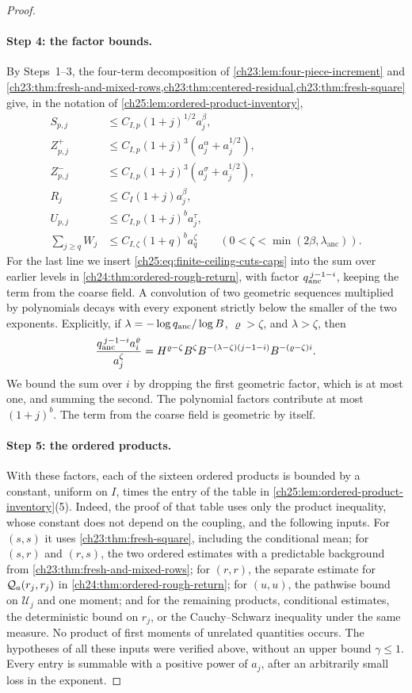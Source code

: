 \begin{proof}
\paragraph{Step 4: the factor bounds.}
By Steps~1--3, the four-term decomposition of \cref{ch23:lem:four-piece-increment} and \cref{ch23:thm:fresh-and-mixed-rows,ch23:thm:centered-residual,ch23:thm:fresh-square} give, in the notation of \cref{ch25:lem:ordered-product-inventory},
\[
\begin{split}
 S_{p,j}&\le C_{I,p}(1+j)^{1/2}a_j^\beta,\\
 Z^+_{p,j}&\le C_{I,p}(1+j)^3(a_j^\alpha+a_j^{1/2}),\\
 Z^-_{p,j}&\le C_{I,p}(1+j)^3(a_j^\sigma+a_j^{1/2}),\\
 R_j&\le C_I(1+j)a_j^\beta,\\
 U_{p,j}&\le C_{I,p}(1+j)^ba_j^\tau,\\
 \sum_{j\ge q}W_j&\le C_{I,\zeta}(1+q)^ba_q^\zeta\qquad(0<\zeta<\min(2\beta,\lambda_{\mathrm{anc}})).
\end{split}
\]
For the last line we insert \eqref{ch25:eq:finite-ceiling-cuts-caps} into the sum over earlier levels in \cref{ch24:thm:ordered-rough-return}, with factor $q_{\mathrm{anc}}^{\,j-1-i}$, keeping the term from the coarse field. A convolution of two geometric sequences multiplied by polynomials decays with every exponent strictly below the smaller of the two exponents. Explicitly, if $\lambda=-\log q_{\mathrm{anc}}/\log B$, $\varrho>\zeta$, and $\lambda>\zeta$, then
\[
 \frac{q_{\mathrm{anc}}^{\,j-1-i}a_i^\varrho}{a_j^\zeta}=H^{\varrho-\zeta}B^\zeta B^{-(\lambda-\zeta)(j-1-i)}B^{-(\varrho-\zeta)i}.
\]
We bound the sum over $i$ by dropping the first geometric factor, which is at most one, and summing the second. The polynomial factors contribute at most $(1+j)^b$. The term from the coarse field is geometric by itself.

\paragraph{Step 5: the ordered products.}
With these factors, each of the sixteen ordered products is bounded by a constant, uniform on $I$, times the entry of the table in \cref{ch25:lem:ordered-product-inventory}(5). Indeed, the proof of that table uses only the product inequality, whose constant does not depend on the coupling, and the following inputs. For $(s,s)$ it uses \cref{ch23:thm:fresh-square}, including the conditional mean; for $(s,r)$ and $(r,s)$, the two ordered estimates with a predictable background from \cref{ch23:thm:fresh-and-mixed-rows}; for $(r,r)$, the separate estimate for $\mathcal Q_{a}(r_j,r_j)$ in \cref{ch24:thm:ordered-rough-return}; for $(u,u)$, the pathwise bound on $\mathcal U_j$ and one moment; and for the remaining products, conditional estimates, the deterministic bound on $r_j$, or the Cauchy--Schwarz inequality under the same measure. No product of first moments of unrelated quantities occurs. The hypotheses of all these inputs were verified above, without an upper bound $\gamma\le1$. Every entry is summable with a positive power of $a_j$, after an arbitrarily small loss in the exponent.


\end{proof}
